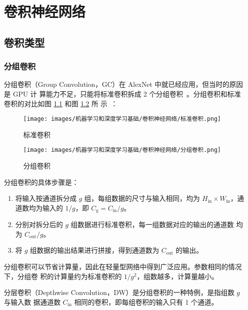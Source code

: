 \chapter{卷积神经网络}

\section{卷积类型}

\subsection{分组卷积}

分组卷积（Group Convolution，GC）在 AlexNet 中就已经应用，但当时的原因是 GPU 计
算能力不足，只能将标准卷积拆成 2 个分组卷积~。分组卷积和标准
卷积的对比如图 \ref{fig:normal-conv} 和图 \ref{fig:group-conv} 所
示~：

\begin{figure}[ht]
  \centering
  \texttt{[image: images/机器学习和深度学习基础/卷积神经网络/标准卷积.png]}
  \caption{标准卷积}
  \label{fig:normal-conv}
\end{figure}

\begin{figure}[ht]
  \centering
  \texttt{[image: images/机器学习和深度学习基础/卷积神经网络/分组卷积.png]}
  \caption{分组卷积}
  \label{fig:group-conv}
\end{figure}

分组卷积的具体步骤是：

\begin{enumerate}
  \item 将输入按通道拆分成 $g$ 组，每组数据的尺寸与输入相同，均为 $H_{\mathrm{in}}
    \times W_{\mathrm{in}}$，通道数均为输入的 $ 1/g $，即 $
    C_{\mathrm{g}} = C_{\mathrm{in}} / g $。
  \item 分别对拆分后的 $g$ 组数据进行标准卷积，每一组数据对应的输出的通道数
    均为 $ C_{\mathrm{out}}/g $。
  \item 将 $g$ 组数据的输出结果进行拼接，得到通道数为 $C_{\mathrm{out}}$
    的输出。
\end{enumerate}

分组卷积可以节省计算量，因此在轻量型网络中得到广泛应用。参数相同的情况下，分组卷
积的计算量约为标准卷积的 $ 1 / g^2 $，组数越多，计算量越小。

分层卷积（Depthwise Convolution，DW）是分组卷积的一种特例，是指组数 $g$ 与输入数
据通道数 $C_{\mathrm{in}}$ 相同的卷积，即每组卷积的输入只有 1 个通道。

